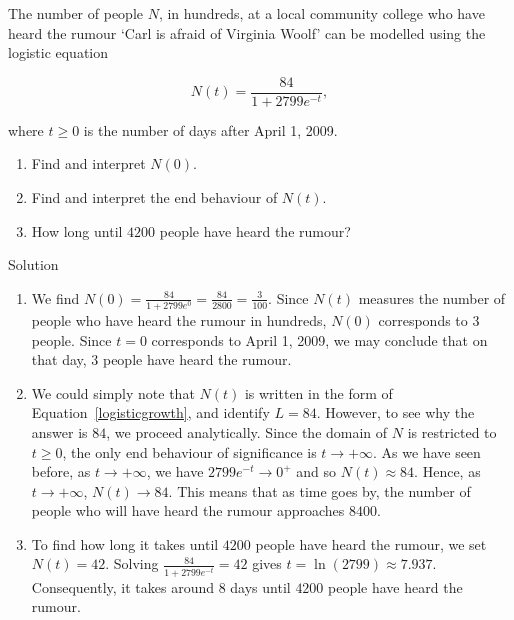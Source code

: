 \begin{example} The number of people $N$, in hundreds, at a local community college who have heard the rumour `Carl is afraid of Virginia Woolf' can be modelled using the logistic equation

\[N(t) = \dfrac{84}{1+2799e^{-t}},\]

where $t\geq 0$ is the number of days after April 1, 2009.


\begin{enumerate}

\item  Find and interpret $N(0)$.

\item  Find and interpret the end behaviour of $N(t)$. 

\item  How long until $4200$ people have heard the rumour?


\end{enumerate}

Solution 

\begin{enumerate}

\item  We find $N(0) = \frac{84}{1+2799e^{0}} = \frac{84}{2800} = \frac{3}{100}$.  Since $N(t)$ measures the number of people who have heard the rumour in hundreds, $N(0)$ corresponds to $3$ people.  Since $t=0$ corresponds to April 1, 2009, we may conclude that on that day, $3$ people have heard the rumour.

\item  We could simply note that $N(t)$ is written in the form of Equation~\eqref{logisticgrowth}, and identify $L = 84$.  However, to see why the answer is $84$, we proceed analytically.  Since the domain of $N$ is restricted to $t \geq 0$, the only end behaviour of significance is $t \rightarrow +\infty$. As we have seen before, as $t \rightarrow +\infty$, we have $2799 e^{-t} \rightarrow 0^{+}$ and so $N(t) \approx 84$.  Hence, as $t \rightarrow +\infty$, $N(t) \rightarrow 84$.   This means that as time goes by, the number of people who will have heard the rumour approaches $8400$. 

\item  To find how long it takes until $4200$ people have heard the rumour, we set $N(t) = 42$.  Solving $\frac{84}{1+2799e^{-t}} = 42$ gives $t =  \ln(2799) \approx 7.937$. Consequently, it takes around $8$ days until $4200$ people have heard the rumour.
\end{enumerate}

\end{example}

